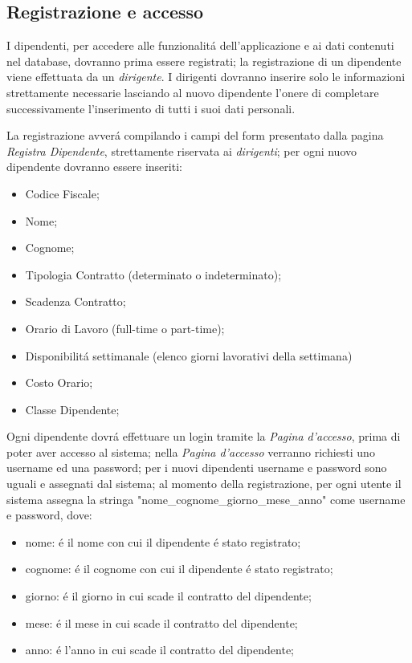 \documentclass[paper=a4, fontsize=11pt]{scrartcl} %
\numberwithin{equation}{section} %
\numberwithin{figure}{section} %
\numberwithin{table}{section} %
\begin{document}
\subsection{Registrazione e accesso}
I dipendenti, per accedere alle funzionalit\'a dell'applicazione e ai dati contenuti
nel database, dovranno prima essere registrati;
la registrazione di un dipendente viene effettuata da un \textit{dirigente}.
I dirigenti dovranno inserire solo le informazioni strettamente necessarie lasciando al nuovo dipendente l'onere di
completare successivamente l'inserimento di tutti i suoi dati personali.

La registrazione avver\'a compilando i campi del form presentato dalla pagina \textit{Registra Dipendente}, strettamente riservata
ai \textit{dirigenti}; per ogni nuovo dipendente dovranno essere inseriti:
\begin{itemize}
	\item Codice Fiscale;
	\item Nome;
	\item Cognome;
	\item Tipologia Contratto (determinato o indeterminato);
	\item Scadenza Contratto;
	\item Orario di Lavoro (full-time o part-time);
  \item Disponibilit\'a settimanale (elenco giorni lavorativi della settimana)
	\item Costo Orario;
	\item Classe Dipendente;
\end{itemize}

Ogni dipendente dovr\'a effettuare un login tramite la
\textit{Pagina d'accesso}, prima di poter aver accesso al sistema; nella \textit{Pagina d'accesso} verranno richiesti
uno username ed una password; per i nuovi dipendenti username e password sono uguali e assegnati dal sistema;
al momento della registrazione, per ogni utente il sistema assegna la stringa "nome\_cognome\_giorno\_mese\_anno" come username e password, dove:
\begin{itemize}
	\item nome: \'e il nome con cui il dipendente \'e stato registrato;
	\item cognome: \'e il cognome con cui il dipendente \'e stato registrato;
	\item giorno: \'e il giorno in cui scade il contratto del dipendente;
	\item mese: \'e il mese in cui scade il contratto del dipendente;
	\item anno: \'e l'anno in cui scade il contratto del dipendente;
\end{itemize}
\end{document}
